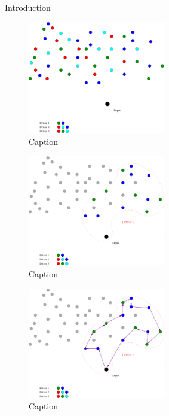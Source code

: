 \begin{frame}[t,allowframebreaks]{Introduction}
    \begin{figure}
        \centering
        \includegraphics[width=6cm]{VRPSS01.pdf}
        \caption{Caption}
        \label{fig:my_label}
    \end{figure}
    \framebreak
    \begin{figure}
        \centering
        \includegraphics[width=6cm]{VRPSS02.pdf}
        \caption{Caption}
        \label{fig:my_label}
    \end{figure}
    \framebreak
    \begin{figure}
        \centering
        \includegraphics[width=6cm]{VRPSS03.pdf}
        \caption{Caption}
        \label{fig:my_label}
    \end{figure}
\end{frame}

